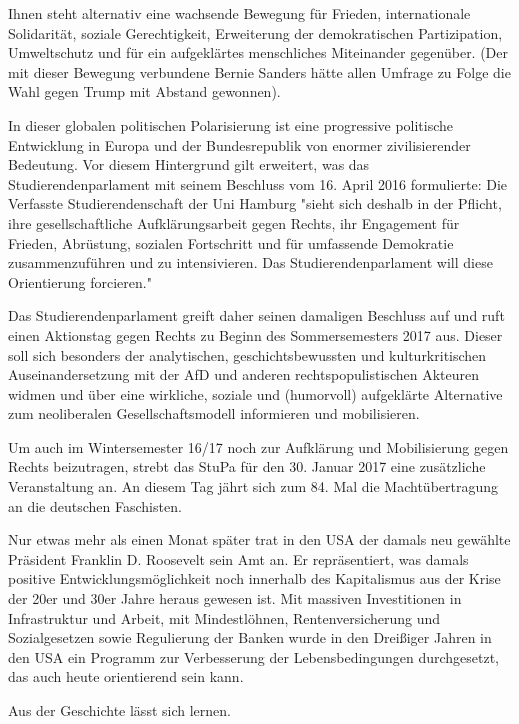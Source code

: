 \documentclass[ngerman,headheight=70pt]{scrartcl}
\begin{document}
    Ihnen steht alternativ eine wachsende Bewegung für Frieden, internationale
    Solidarität, soziale Gerechtigkeit, Erweiterung der demokratischen
    Partizipation, Umweltschutz und für ein aufgeklärtes menschliches Miteinander
    gegenüber. (Der mit dieser Bewegung verbundene Bernie Sanders hätte allen
    Umfrage zu Folge die Wahl gegen Trump mit Abstand gewonnen).

    In dieser globalen politischen Polarisierung ist eine progressive politische
    Entwicklung in Europa und der Bundesrepublik von enormer zivilisierender
    Bedeutung. Vor diesem Hintergrund gilt erweitert, was das Studierendenparlament
    mit seinem Beschluss vom 16. April 2016 formulierte: Die Verfasste
    Studierendenschaft der Uni Hamburg "sieht sich deshalb in der Pflicht, ihre
    gesellschaftliche Aufklärungsarbeit gegen Rechts, ihr Engagement für Frieden,
    Abrüstung, sozialen Fortschritt und für umfassende Demokratie zusammenzuführen
    und zu intensivieren. Das Studierendenparlament will diese Orientierung forcieren."

    Das Studierendenparlament greift daher seinen damaligen Beschluss auf und
    ruft einen Aktionstag gegen Rechts zu Beginn des Sommersemesters 2017 aus.
    Dieser soll sich besonders der analytischen, geschichtsbewussten und
    kulturkritischen Auseinandersetzung mit der AfD und anderen rechtspopulistischen
    Akteuren widmen und über eine wirkliche, soziale und (humorvoll) aufgeklärte
    Alternative zum neoliberalen Gesellschaftsmodell informieren und mobilisieren.

    Um auch im Wintersemester 16/17 noch zur Aufklärung und Mobilisierung gegen
    Rechts beizutragen, strebt das StuPa für den 30. Januar 2017 eine zusätzliche
    Veranstaltung an. An diesem Tag jährt sich zum 84. Mal die Machtübertragung
    an die deutschen Faschisten.

    Nur etwas mehr als einen Monat später trat in den USA der damals neu gewählte
    Präsident Franklin D. Roosevelt sein Amt an. Er repräsentiert, was damals
    positive Entwicklungsmöglichkeit noch innerhalb des Kapitalismus aus der Krise
    der 20er und 30er Jahre heraus gewesen ist. Mit massiven Investitionen in
    Infrastruktur und Arbeit, mit Mindestlöhnen, Rentenversicherung und
    Sozialgesetzen sowie Regulierung der Banken wurde in den Dreißiger Jahren in
    den USA ein Programm zur Verbesserung der Lebensbedingungen durchgesetzt,
    das auch heute orientierend sein kann.

    Aus der Geschichte lässt sich lernen.
\end{document}
